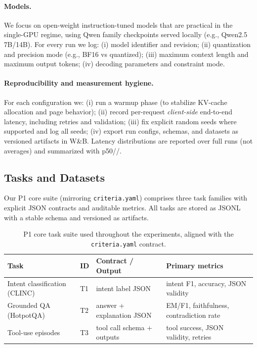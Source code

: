 \paragraph{Models.}
We focus on open-weight instruction-tuned models that are practical in the single-GPU regime, using Qwen family checkpoints served locally (e.g., Qwen2.5 7B/14B).
For every run we log:
(i) model identifier and revision;
(ii) quantization and precision mode (e.g., BF16 vs quantized);
(iii) maximum context length and maximum output tokens;
(iv) decoding parameters and constraint mode.

\paragraph{Reproducibility and measurement hygiene.}
For each configuration we:
(i) run a warmup phase (to stabilize KV-cache allocation and page behavior);
(ii) record per-request \emph{client-side} end-to-end latency, including retries and validation;
(iii) fix explicit random seeds where supported and log all seeds;
(iv) export run configs, schemas, and datasets as versioned artifacts in W\&B.
Latency distributions are reported over full runs (not averages) and summarized with p50/\pninetyfive/\pninetynine.

\subsection{Tasks and Datasets}
\label{sec:tasks}

Our P1 core suite (mirroring \texttt{criteria.yaml}) comprises three task families with explicit JSON contracts and auditable metrics.
All tasks are stored as JSONL with a stable schema and versioned as artifacts.

\begin{table}[t]
\centering
\small
\begin{tabular}{@{}llll@{}}
\toprule
\textbf{Task} & \textbf{ID} & \textbf{Contract / Output} & \textbf{Primary metrics} \\
\midrule
Intent classification (CLINC) & T1 & intent label JSON & intent F1, accuracy, JSON validity \\
Grounded QA (HotpotQA) & T2 & answer + explanation JSON & EM/F1, faithfulness, contradiction rate \\
Tool-use episodes & T3 & tool call schema + outputs & tool success, JSON validity, retries \\
\bottomrule
\end{tabular}
\caption{P1 core task suite used throughout the experiments, aligned with the \texttt{criteria.yaml} contract.}
\label{tab:task-suite}
\end{table}

